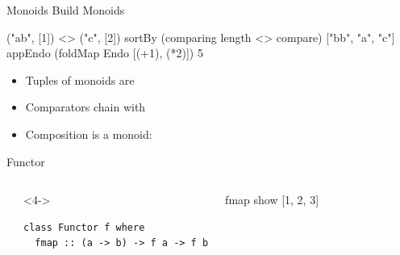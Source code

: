 \begin{frame}{Monoids Build Monoids}
\begin{ghcisession}
("ab", [1]) <> ("c", [2])
sortBy (comparing length <> compare) ["bb", "a", "c"]
appEndo (foldMap Endo [(+1), (*2)]) 5
\end{ghcisession}
\vspace{2mm}
\begin{itemize}
   \item<2-> Tuples of monoids are 
   \item<3-> Comparators chain with \ihs{<>}
   \item<4-> Composition is a monoid: 
\end{itemize}
\end{frame}

\begin{frame}[fragile]{Functor}
\begin{fullwidth}
\begin{columns}[c,onlytextwidth]
\centering
{}\\[3mm]
%
\\[3mm]
\begin{uncoverenv}<4->
\begin{verbatim}
class Functor f where
  fmap :: (a -> b) -> f a -> f b
\end{verbatim}
\end{uncoverenv}
\begin{ghcisession}[start=5]
fmap show [1, 2, 3]
\end{ghcisession}
\end{columns}
\end{fullwidth}
\end{frame}

